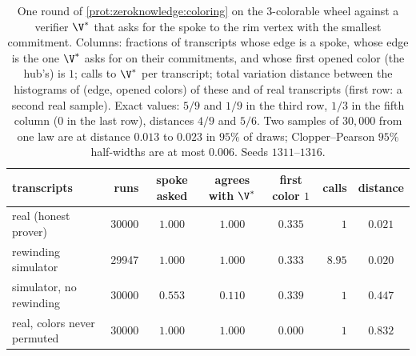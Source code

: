 \begin{refsection}
\begin{table}[t]
\begin{fullwidth}
\centering\small
\begin{tabular}{@{}l r c c c r c@{}}
\toprule
transcripts & runs & spoke asked & agrees with $\V^*$ & first color $1$ & calls & distance \\
\midrule
real (honest prover) & \num{30000} & $1.000$ & $1.000$ & $0.335$ & $1$ & $0.021$ \\
rewinding simulator & \num{29947} & $1.000$ & $1.000$ & $0.333$ & $8.95$ & $0.020$ \\
simulator, no rewinding & \num{30000} & $0.553$ & $0.110$ & $0.339$ & $1$ & $0.447$ \\
real, colors never permuted & \num{30000} & $1.000$ & $1.000$ & $0.000$ & $1$ & $0.832$ \\
\bottomrule
\end{tabular}
\caption{One round of \cref{prot:zeroknowledge:coloring} on the 3-colorable wheel against a verifier $\V^*$ that asks for the spoke to the rim vertex with the smallest commitment. Columns: fractions of transcripts whose edge is a spoke, whose edge is the one $\V^*$ asks for on their commitments, and whose first opened color (the hub's) is $1$; calls to $\V^*$ per transcript; total variation distance between the histograms of (edge, opened colors) of these and of real transcripts (first row: a second real sample). Exact values: $5/9$ and $1/9$ in the third row, $1/3$ in the fifth column ($0$ in the last row), distances $4/9$ and $5/6$. Two samples of $30{,}000$ from one law are at distance $0.013$ to $0.023$ in $95\%$ of draws; Clopper--Pearson $95\%$ half-widths are at most $0.006$. Seeds $1311$--$1316$.}\label{tab:zeroknowledge:sim}
\end{fullwidth}
\end{table}


\end{refsection}

